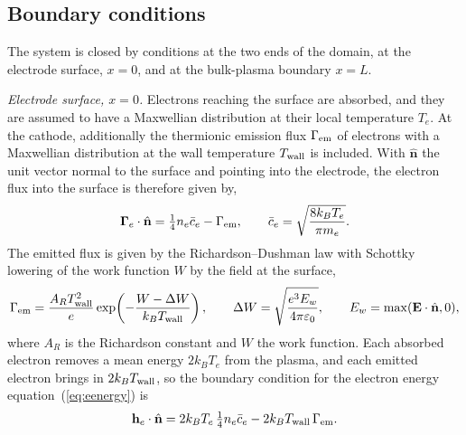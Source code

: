 \subsection{Boundary conditions}
\label{sec:model-bc}

The system is closed by conditions at the two ends of the domain, at the electrode surface, \(x=0\), and at the bulk-plasma boundary \(x=L\).

\emph{Electrode surface, \(x=0\).} Electrons reaching the surface are absorbed, and they are assumed to have a Maxwellian distribution at their local temperature \(T_e\). At the cathode, additionally the thermionic emission flux \(\Gamma_{\rm em}\) of electrons with a Maxwellian distribution at the wall temperature \(T_{\rm wall}\) is included. With \(\hat{\mathbf{n}}\) the unit vector normal to the surface and pointing into the electrode, the electron flux into the surface is therefore given by,
\begin{equation}
\boldsymbol{\Gamma}_e\cdot\hat{\mathbf{n}}=\tfrac14n_e\bar c_e-\Gamma_{\rm em},
\qquad
\bar c_e=\sqrt{\frac{8k_BT_e}{\pi m_e}} .
\label{eq:bc-electron}
\end{equation}
The emitted flux is given by the Richardson--Dushman law with Schottky lowering of the work function \(W\) by the field at the surface,
\begin{equation}
\Gamma_{\rm em}=\frac{A_RT_{\rm wall}^2}{e}\exp\!\left(-\frac{W-\Delta W}{k_BT_{\rm wall}}\right),
\qquad
\Delta W=\sqrt{\frac{e^3E_w}{4\pi\varepsilon_0}},
\qquad
E_w=\max(\mathbf{E}\cdot\hat{\mathbf{n}},0),
\label{eq:bc-emission}
\end{equation}
where \(A_R\) is the Richardson constant and \(W\) the work function. Each absorbed electron removes a mean energy \(2k_BT_e\) from the plasma, and each emitted electron brings in \(2k_BT_{\rm wall}\), so the boundary condition for the electron energy equation~(\ref{eq:eenergy}) is
\begin{equation}
\mathbf{h}_e\cdot\hat{\mathbf{n}}=2k_BT_e\,\tfrac14n_e\bar c_e-2k_BT_{\rm wall}\,\Gamma_{\rm em} .
\label{eq:bc-electron-energy}
\end{equation}

